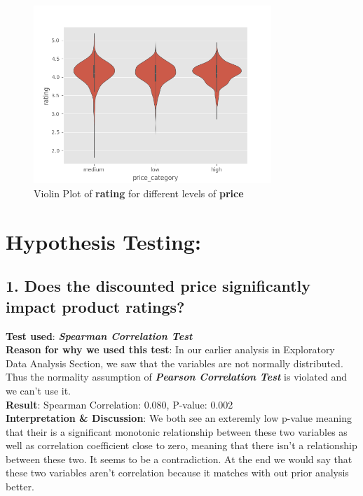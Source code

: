 \documentclass[a4paper,12pt]{article}
\begin{document}
\begin{figure}[H]
    \centering
    \includegraphics[width=0.8\textwidth]{./images/violinplot_of_rating_for_different_price_groups.png} %
    \caption{Violin Plot of \textbf{rating} for different levels of \textbf{price}}
    \label{fig:Figure_7}
\end{figure}


\section*{Hypothesis Testing:}

\subsection*{1. Does the \textbf{discounted price} significantly impact product \textbf{ratings?}}

\noindent\textbf{Test used}: \textit{\textbf{Spearman Correlation Test}} \\ 

\noindent\textbf{Reason for why we used this test}: In our earlier analysis in Exploratory Data Analysis Section, we saw that the variables are not normally distributed. Thus the normality assumption of \textit{\textbf{Pearson Correlation Test}} is violated and we can't use it.\\

\noindent\textbf{Result}: Spearman Correlation: 0.080, P-value: 0.002\\ 

\noindent\textbf{Interpretation \& Discussion}: We both see an exteremly low p-value meaning that their is a significant monotonic relationship between these two variables as well as correlation coefficient close to zero, meaning that there isn't a relationship between these two. It seems to be a contradiction. At the end we would say that these two variables aren't correlation because it matches with out prior analysis better. \\
\end{document}
